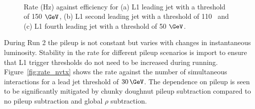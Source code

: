 \begin{figure}[h!]
  \centering
    ~
    \\
  \caption{\label{fig:rate_eff_jets} Rate (Hz) against efficiency for (a) L1 leading jet with a threshold of 150 $\GeV$, 
  (b) L1 second leading jet with a threshold of 110 \GeV~and (c) L1 fourth leading jet with a threshold of 50 $\GeV$.}
\end{figure}

During Run 2 the pileup is not constant but varies with changes in instantaneous luminosity. 
Stability in the rate for different pileup scenarios is import to ensure that L1 trigger thresholds 
do not need to be increased during running. Figure~\ref{fig:rate_nvtx} shows the rate against the number of 
simultaneous interactions for a lead jet threshold of $30\,\GeV$. The dependence on pileup is 
seen to be significantly mitigated by chunky doughnut pileup subtraction compared to no pileup subtraction and global $\rho$
subtraction. 

